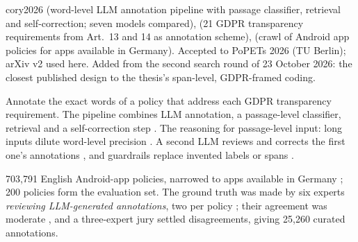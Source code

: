 \begin{papercard}{cory2026}
  (word-level LLM annotation pipeline with passage classifier, retrieval and self-correction; seven models compared),  (21 GDPR transparency requirements from Art.\ 13 and 14 as annotation scheme),  (crawl of Android app policies for apps available in Germany). Accepted to PoPETs 2026 (TU Berlin); arXiv v2 used here. Added from the second search round of 23 October 2026: the closest published design to the thesis's span-level, GDPR-framed coding.

 Annotate the exact words of a policy that address each GDPR transparency requirement. The pipeline combines LLM annotation, a passage-level classifier, retrieval and a self-correction step . The reasoning for passage-level input: long inputs dilute word-level precision . A second LLM reviews and corrects the first one's annotations , and guardrails replace invented labels or spans .

 703,791 English Android-app policies, narrowed to apps available in Germany ; 200 policies form the evaluation set. The ground truth was made by six experts \emph{reviewing LLM-generated annotations}, two per policy ; their agreement was moderate , and a three-expert jury settled disagreements, giving 25,260 curated annotations.


\end{papercard}
